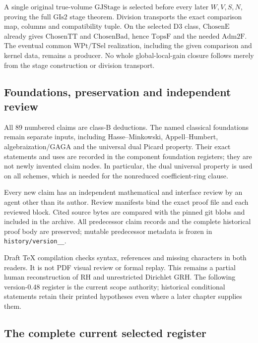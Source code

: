 \documentclass[11pt,a4paper]{article}
\numberwithin{equation}{section}
\theoremstyle{remark}\newtheorem{remark}[theorem]{Remark}
\begin{document}
A single original true-volume \(\mathrm{GJStage}\) is selected
before every later \(W,V,S,N\), proving the full
\(\mathrm{GIs2}\) stage theorem. Division transports the exact
comparison map, columns and compatibility tuple. On the selected
D3 class, \(\mathrm{ChosenE}\) already gives
\(\mathrm{ChosenTT}\) and \(\mathrm{ChosenBad}\), hence
\(\mathrm{TopsF}\) and the needed \(\mathrm{Adm2F}\).
The eventual common \(\mathrm{WPt}/\mathrm{TSel}\) realization,
including the given comparison and kernel data, remains a producer.
No whole global-local-gain closure follows merely from the stage
construction or division transport.

\subsection{Foundations, preservation and independent review}

All 89 numbered claims are class-B deductions. The named classical
foundations remain separate inputs, including Hasse--Minkowski,
Appell--Humbert, algebraization/GAGA and the universal dual Picard
property. Their exact statements and uses are recorded in the
component foundation registers; they are not newly invented claim
nodes. In particular, the dual universal property is used on all
schemes, which is needed for the nonreduced coefficient-ring clause.

Every new claim has an independent mathematical and interface review
by an agent other than its author. Review manifests bind the exact
proof file and each reviewed block. Cited source bytes are compared
with the pinned git blobs and included in the archive. All predecessor
claim records and the complete historical proof body are preserved;
mutable predecessor metadata is frozen in
\texttt{history/\allowbreak version\_\_}.

Draft TeX compilation checks syntax, references and missing characters
in both readers. It is not PDF visual review or formal replay.
This remains a partial human reconstruction of RH and unrestricted
Dirichlet GRH. The following version-0.48 register is the current
scope authority; historical conditional statements retain their
printed hypotheses even where a later chapter supplies them.

\subsection{The complete current selected register}
\end{document}
